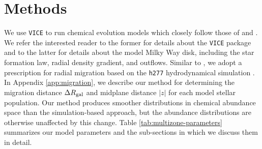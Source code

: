 \documentclass[twocolumn,twocolappendix,linenumbers]{aastex631}
\newcommand{\vice}{{\tt VICE}\xspace}
\newcommand{\hydro}{{\tt h277}\xspace}
\begin{document}
\section{Methods}
\label{sec:methods}

We use \vice to run chemical evolution models which closely follow those of \citet{JohnsonWeinberg2020-Starbursts} and \citet[][hereafter ]{Johnson2021-Migration}. We refer the interested reader to the former for details about the \vice package and to the latter for details about the model Milky Way disk, including the star formation law, radial density gradient, and outflows. Similar to , we adopt a prescription for radial migration based on the \hydro hydrodynamical simulation \citep{Christensen2012-h277}. In Appendix \ref{app:migration}, we describe our method for determining the migration distance $\Delta R_{\rm gal}$ and midplane distance $|z|$ for each model stellar population. Our method produces smoother distributions in chemical abundance space than the simulation-based approach, but the abundance distributions are otherwise unaffected by this change. Table \ref{tab:multizone-parameters} summarizes our model parameters and the sub-sections in which we discuss them in detail.
\end{document}
